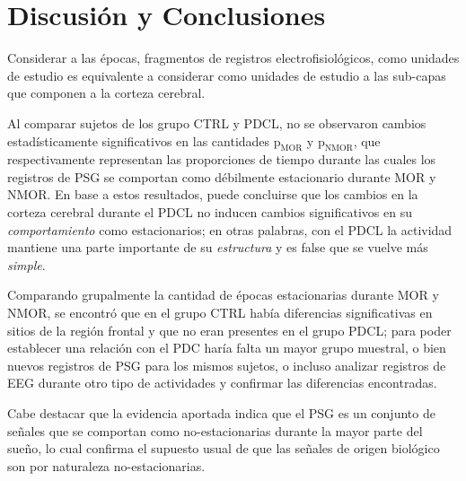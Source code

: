 \documentclass[12pt,letterpaper]{book}
\begin{document}

\chapter{Discusión y Conclusiones}

Considerar a las épocas, fragmentos de registros electrofisiológicos, como unidades de estudio es equivalente a considerar como unidades de estudio a las sub-capas que componen a la corteza cerebral.

Al comparar sujetos de los grupo CTRL y PDCL, no se observaron cambios estadísticamente significativos en las cantidades $\text{p}_{\text{MOR}}$ y $\text{p}_{\text{NMOR}}$, que respectivamente representan las proporciones de tiempo durante las cuales los registros de PSG se comportan como débilmente estacionario durante MOR y NMOR. 
%
En base a estos resultados, puede concluirse que los cambios en la corteza cerebral durante el PDCL no inducen cambios significativos en su \textit{comportamiento} como estacionarios;
en otras palabras, con el PDCL la actividad mantiene una parte importante de su \textit{estructura} y es false que se vuelve más \textit{simple}.

Comparando grupalmente la cantidad de épocas estacionarias durante MOR y NMOR, se encontró que en 
el grupo CTRL había diferencias significativas en sitios de la región frontal y que no eran presentes
en el grupo PDCL; para poder establecer una relación con el PDC haría falta un mayor grupo muestral, 
o bien nuevos registros de PSG para los mismos sujetos, o incluso analizar registros de EEG durante 
otro tipo de actividades y confirmar las diferencias encontradas.

Cabe destacar que la evidencia aportada indica que el PSG es un conjunto de señales que se comportan
como no-estacionarias durante la mayor parte del sueño, lo cual confirma el supuesto usual de que 
las señales de origen biológico son por naturaleza no-estacionarias. 

\end{document}

